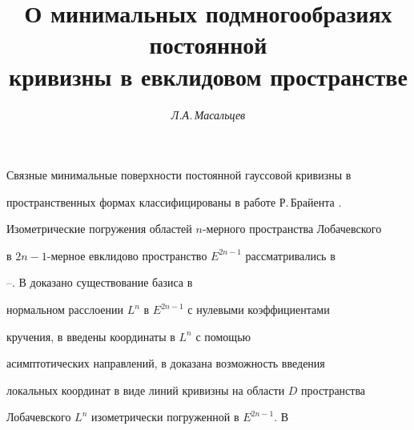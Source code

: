 



\author{\it Л.А.\,Масальцев} 




\title{О минимальных подмногообразиях постоянной\\ 


кривизны в евклидовом пространстве} 


 


\date{} 




 


\pagestyle{plain} %


 


 




 


\maketitle 


\label{begin} 


 


Связные минимальные поверхности постоянной гауссовой кривизны в 


пространственных формах классифицированы в работе Р.\,Брайента \cite{1}. 


Изометрические погружения областей $n$-мерного пространства Лобачевского 


в $2n-1$-мерное евклидово пространство $E^{2n-1}$ рассматривались в 


\cite{2}--\cite{4}. В \cite{2} доказано существование базиса в 


нормальном расслоении $L^n$ в $E^{2n-1}$ с нулевыми коэффициентами 


кручения, в \cite{3} введены координаты в $L^n$ с помощью 


асимптотических направлений, в \cite{4} доказана возможность введения 


локальных координат в виде линий кривизны на области $D$ пространства 


Лобачевского $L^n$ изометрически погруженной в $E^{2n-1}$. В \cite{5} 



